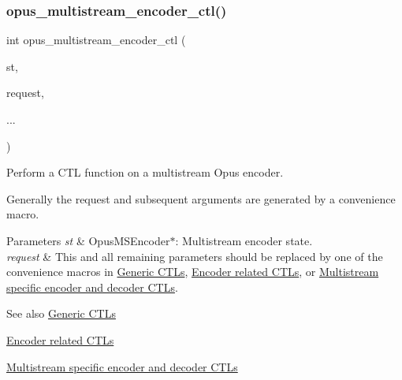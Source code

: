 \mbox{\label{group__opus__multistream_gae14328330c548dede66c494f51e33707}} 
\subsubsection{\texorpdfstring{opus\+\_\+multistream\+\_\+encoder\+\_\+ctl()}{opus\_multistream\_encoder\_ctl()}}
{\footnotesize\ttfamily int opus\+\_\+multistream\+\_\+encoder\+\_\+ctl (\begin{DoxyParamCaption}\item[{\hyperlink{group__opus__multistream_gae5826674d142fc873ebc1d781c507dd7}{Opus\+M\+S\+Encoder} $\ast$}]{st,  }\item[{int}]{request,  }\item[{}]{... }\end{DoxyParamCaption})}



Perform a C\+TL function on a multistream Opus encoder. 

Generally the request and subsequent arguments are generated by a convenience macro. 
\begin{DoxyParams}{Parameters}
{\em st} & {\ttfamily Opus\+M\+S\+Encoder$\ast$}\+: Multistream encoder state. \\
\hline
{\em request} & This and all remaining parameters should be replaced by one of the convenience macros in \hyperlink{group__opus__genericctls}{Generic C\+T\+Ls}, \hyperlink{group__opus__encoderctls}{Encoder related C\+T\+Ls}, or \hyperlink{group__opus__multistream__ctls}{Multistream specific encoder and decoder C\+T\+Ls}. \\
\hline
\end{DoxyParams}
\begin{DoxySeeAlso}{See also}
\hyperlink{group__opus__genericctls}{Generic C\+T\+Ls} 

\hyperlink{group__opus__encoderctls}{Encoder related C\+T\+Ls} 

\hyperlink{group__opus__multistream__ctls}{Multistream specific encoder and decoder C\+T\+Ls} 
\end{DoxySeeAlso}
\mbox{\label{group__opus__multistream_gaec819b8d4b38350aba6959cee7d33f94}} 
